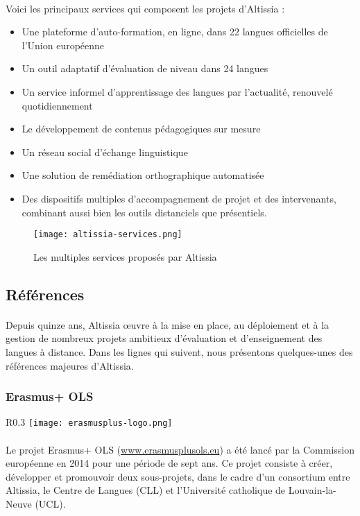 \paragraph{}
Voici les principaux services qui composent les projets d’Altissia :
\begin{itemize}
    \item Une plateforme d’auto-formation, en ligne, dans 22 langues officielles de l’Union européenne
    \item Un outil adaptatif d’évaluation de niveau dans 24 langues
    \item Un service informel d’apprentissage des langues par l’actualité, renouvelé quotidiennement
    \item Le développement de contenus pédagogiques sur mesure
    \item Un réseau social d’échange linguistique
    \item Une solution de remédiation orthographique automatisée
    \item Des dispositifs multiples d’accompagnement de projet et des intervenants, combinant aussi bien les outils distanciels que présentiels.
\end{itemize}
\begin{figure}[ht]
    \centering
    \texttt{[image: altissia-services.png]}
    \caption{Les multiples services proposés par Altissia}
    \label{fig:altissia-services}
\end{figure}

\subsection{Références}
\paragraph{}
Depuis quinze ans, Altissia œuvre à la mise en place, au déploiement et à la gestion de nombreux projets ambitieux d’évaluation et d’enseignement des langues à distance. Dans les lignes qui suivent, nous présentons quelques-unes des références majeures d’Altissia.

\subsubsection{Erasmus+ OLS}
\begin{wrapfigure}{R}{0.3\textwidth}
    \centering
    \texttt{[image: erasmusplus-logo.png]}
\end{wrapfigure}
\paragraph{}
Le projet Erasmus+ OLS (\url{www.erasmusplusols.eu}) a été lancé par la Commission européenne en 2014 pour une période de sept ans. Ce projet consiste à créer, développer et promouvoir deux sous-projets, dans le cadre d’un consortium entre Altissia, le Centre de Langues (CLL\cite{cll_actualites_nodate}) et l’Université catholique de Louvain-la-Neuve (UCL).
 

